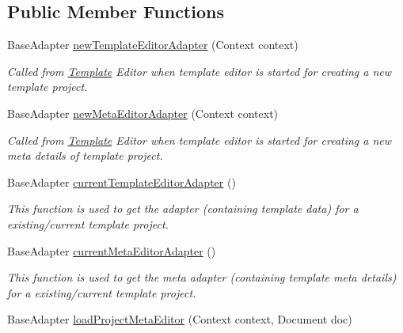 \subsection*{Public Member Functions}
\begin{DoxyCompactItemize}
\item 
Base\+Adapter \hyperlink{interfaceorg_1_1buildmlearn_1_1toolkit_1_1model_1_1TemplateInterface_af7d9d92709123fc39693504884e4f7e2}{new\+Template\+Editor\+Adapter} (Context context)
\begin{DoxyCompactList}\small\item\em Called from \hyperlink{enumorg_1_1buildmlearn_1_1toolkit_1_1model_1_1Template}{Template} Editor when template editor is started for creating a new template project. \end{DoxyCompactList}\item 
Base\+Adapter \hyperlink{interfaceorg_1_1buildmlearn_1_1toolkit_1_1model_1_1TemplateInterface_acbf649946d2636f02e154dfefaadf868}{new\+Meta\+Editor\+Adapter} (Context context)
\begin{DoxyCompactList}\small\item\em Called from \hyperlink{enumorg_1_1buildmlearn_1_1toolkit_1_1model_1_1Template}{Template} Editor when template editor is started for creating a new meta details of template project. \end{DoxyCompactList}\item 
Base\+Adapter \hyperlink{interfaceorg_1_1buildmlearn_1_1toolkit_1_1model_1_1TemplateInterface_ae433eedc291006e78b65b0fc4135d560}{current\+Template\+Editor\+Adapter} ()
\begin{DoxyCompactList}\small\item\em This function is used to get the adapter (containing template data) for a existing/current template project. \end{DoxyCompactList}\item 
Base\+Adapter \hyperlink{interfaceorg_1_1buildmlearn_1_1toolkit_1_1model_1_1TemplateInterface_a2b24967afaab00b7dcce5083b829bb95}{current\+Meta\+Editor\+Adapter} ()
\begin{DoxyCompactList}\small\item\em This function is used to get the meta adapter (containing template meta details) for a existing/current template project. \end{DoxyCompactList}\item 
Base\+Adapter \hyperlink{interfaceorg_1_1buildmlearn_1_1toolkit_1_1model_1_1TemplateInterface_a589528c60323c07cca5e6ef112530a50}{load\+Project\+Meta\+Editor} (Context context, Document doc)

\end{DoxyCompactItemize}
